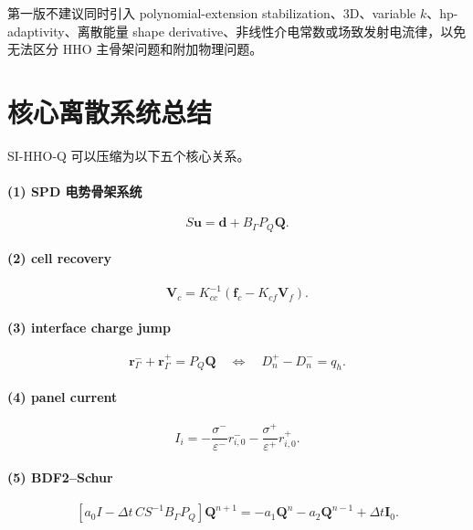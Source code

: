 \documentclass[UTF8,a4paper,11pt]{ctexart}
\newcommand{\eps}{\varepsilon}
\newcommand{\vct}[1]{\bm{#1}}
\begin{document}
第一版不建议同时引入 polynomial-extension stabilization、3D、variable \(k\)、hp-adaptivity、离散能量 shape derivative、非线性介电常数或场致发射电流律，以免无法区分 HHO 主骨架问题和附加物理问题。

\section{核心离散系统总结}

SI-HHO-Q 可以压缩为以下五个核心关系。

\paragraph{(1) SPD 电势骨架系统}
\begin{equation}
\boxed{
S\vct u=\vct d+B_\Gamma P_Q\vct Q.
}
\end{equation}

\paragraph{(2) cell recovery}
\begin{equation}
\boxed{
\vct V_c=K_{cc}^{-1}(\vct f_c-K_{cf}\vct V_f).
}
\end{equation}

\paragraph{(3) interface charge jump}
\begin{equation}
\boxed{
\vct r^-_\Gamma+\vct r^+_\Gamma=P_Q\vct Q
\quad\Longleftrightarrow\quad
D_n^+-D_n^-=q_h.
}
\end{equation}

\paragraph{(4) panel current}
\begin{equation}
\boxed{
I_i
=-\frac{\sigma^-}{\eps^-}r^-_{i,0}
-\frac{\sigma^+}{\eps^+}r^+_{i,0}.
}
\end{equation}

\paragraph{(5) BDF2--Schur}
\begin{equation}
\boxed{
\left[
a_0I-
\Delta t\,CS^{-1}B_\Gamma P_Q
\right]\vct Q^{n+1}
=
-a_1\vct Q^n-a_2\vct Q^{n-1}
+\Delta t\vct I_0.
}
\end{equation}
\end{document}
